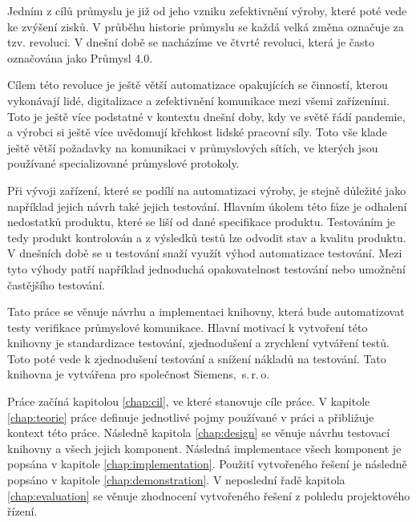 \begin{introduction}

Jedním z cílů průmyslu je již od jeho vzniku zefektivnění výroby, které poté vede ke zvýšení zisků. V průběhu historie průmyslu se každá velká změna označuje za tzv. revoluci. V dnešní době se nacházíme ve čtvrté revoluci, která je často označována jako Průmysl 4.0. 

Cílem této revoluce je ještě větší automatizace opakujících se činností, kterou vykonávají lidé, digitalizace a zefektivnění komunikace mezi všemi zařízeními. Toto je ještě více podstatné v kontextu dnešní doby, kdy ve světě řádí pandemie, a výrobci si ještě více uvědomují křehkost lidské pracovní síly. Toto vše klade ještě větší požadavky na komunikaci v průmyslových sítích, ve kterých jsou používané specializované průmyslové protokoly. 

Při vývoji zařízení, které se podílí na automatizaci výroby, je stejně důležité jako například jejich návrh také jejich testování. Hlavním úkolem této fáze je odhalení nedostatků produktu, které se liší od dané specifikace produktu. Testováním je tedy produkt kontrolován a z výsledků testů lze odvodit stav a kvalitu produktu. V dnešních době se u testování snaží využít výhod automatizace testování. Mezi tyto výhody patří například jednoduchá opakovatelnost testování nebo umožnění častějšího testování. 

Tato práce se věnuje návrhu a implementaci knihovny, která bude automatizovat testy verifikace průmyslové komunikace. Hlavní motivací k vytvoření této knihovny je standardizace testování, zjednodušení a zrychlení vytváření testů. Toto poté vede k zjednodušení testování a snížení nákladů na testování. Tato knihovna je vytvářena pro společnost Siemens,~s.\,{}r.\,{}o.

Práce začíná kapitolou \ref{chap:cil}, ve které stanovuje cíle práce. V kapitole \ref{chap:teorie} práce definuje jednotlivé pojmy používané v práci a přibližuje kontext této práce. Následně kapitola \ref{chap:design} se věnuje návrhu testovací knihovny a všech jejich komponent. Následná implementace všech komponent je popsána v kapitole \ref{chap:implementation}. Použití vytvořeného řešení je následně popsáno v kapitole \ref{chap:demonstration}. V neposlední řadě kapitola \ref{chap:evaluation} se věnuje zhodnocení vytvořeného řešení z pohledu projektového řízení.
\end{introduction}